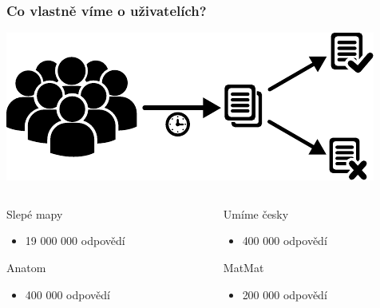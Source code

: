 \documentclass[xcolor=svgnames]{beamer}
\begin{document}
\begin{frame}
	\frametitle{Co vlastně víme o uživatelích?}
	\includegraphics[width=\textwidth]{img/data_collection}

	\pause
	\begin{columns}
		\begin{column}{.5\textwidth}
			Slepé mapy
			\begin{itemize}
				\item 19 000 000 odpovědí
			\end{itemize}
			Anatom
			\begin{itemize}
				\item 400 000 odpovědí
			\end{itemize}
		\end{column}
		\begin{column}{.5\textwidth}
			Umíme česky
			\begin{itemize}
				\item 400 000 odpovědí
			\end{itemize}
			MatMat
			\begin{itemize}
				\item 200 000 odpovědí
			\end{itemize}
		\end{column}
	\end{columns}
\end{frame}
\end{document}
